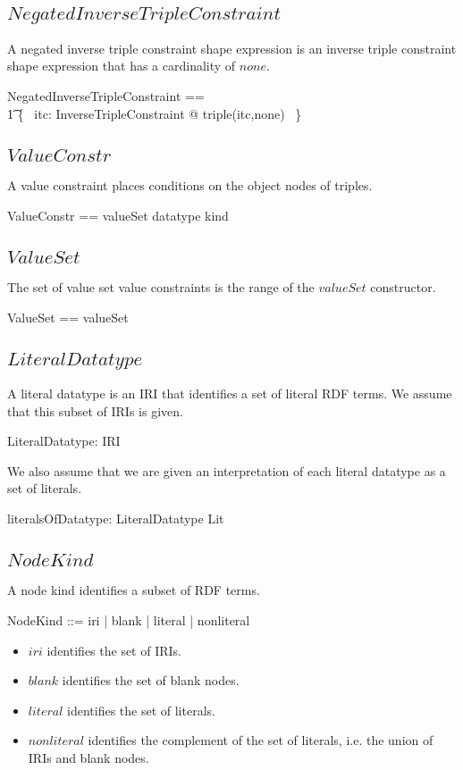 \documentclass{article}
\begin{document}
\subsection{$NegatedInverseTripleConstraint$}
A negated inverse triple constraint shape expression is an inverse triple constraint shape expression that has a cardinality of $none$.
\begin{zed}
	NegatedInverseTripleConstraint == \\
\t1		\{~ itc: InverseTripleConstraint @ triple(itc,none) ~\}
\end{zed}

\subsection{$ValueConstr$}
A value constraint places conditions on the object nodes of triples.
\begin{zed}
	ValueConstr == \ran valueSet \cup \ran datatype \cup \ran kind
\end{zed}

\subsection{$ValueSet$}
The set of value set value constraints is the range of the $valueSet$ constructor.
\begin{zed}
	ValueSet == \ran valueSet
\end{zed}

\subsection{$LiteralDatatype$}
A literal datatype is an IRI that identifies a set of literal RDF terms.
We assume that this subset of IRIs is given.
\begin{axdef}
	LiteralDatatype: \power IRI
\end{axdef}

We also assume that we are given an interpretation of each literal datatype as a set of literals.
\begin{axdef}
	literalsOfDatatype: LiteralDatatype \fun \power Lit
\end{axdef}

\subsection{$NodeKind$}
A node kind identifies a subset of RDF terms.
\begin{zed}
	NodeKind ::= iri | blank | literal | nonliteral
\end{zed}
\begin{itemize}
\item $iri$ identifies the set of IRIs.
\item $blank$ identifies the set of blank nodes.
\item $literal$ identifies the set of literals.
\item $nonliteral$ identifies the complement of the set of literals, i.e. the union of IRIs and blank nodes.
\end{itemize}
\end{document}
